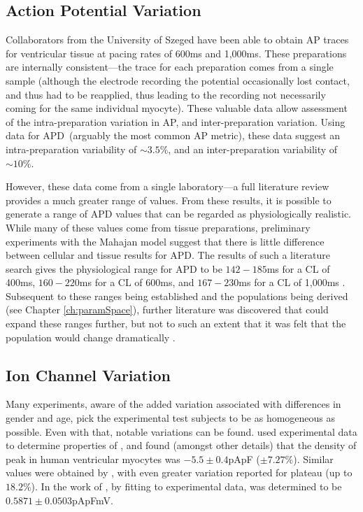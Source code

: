 \documentclass[../thesis-main.tex]{subfiles}
\begin{document}
\subsection{Action Potential Variation}
\label{subsec:ap-variation}
Collaborators from the University of Szeged have been able to obtain AP traces for ventricular tissue at pacing rates of 600ms and 1,000ms. These preparations are internally consistent---the trace for each preparation comes from a single sample (although the electrode recording the potential occasionally lost contact, and thus had to be reapplied, thus leading to the recording not necessarily coming for the same individual myocyte). These valuable data allow assessment of the intra-preparation variation in AP, and inter-preparation variation. Using data for APD~(arguably the most common AP metric), these data suggest an intra-preparation variability of $\sim3.5\%$, and an inter-preparation variability of $\sim10\%$.

However, these data come from a single laboratory---a full literature review provides a much greater range of values. From these results, it is possible to generate a range of APD values that can be regarded as physiologically realistic. While many of these values come from tissue preparations, preliminary experiments with the Mahajan model suggest that there is little difference between cellular and tissue results for APD. The results of such a literature search gives the physiological range for APD to be $142-185$ms for a CL of 400ms, $160-220$ms for a CL of 600ms, and $167-230$ms for a CL of 1,000ms \citep{Biagetti2006, Szigligeti1996, Yan2001, Jung2011, Goldhaber2005, Wu2011, Wu2008, Wu2008a, Chen2006, Kirchhof2003, Eckardt1998, Zabel1997, Zabel1997a, Kurz1993, McIntosh2000}. Subsequent to these ranges being established and the populations being derived (see Chapter \ref{ch:paramSpace}), further literature was discovered that could expand these ranges further, but not to such an extent that it was felt that the population would change dramatically \citep{Wu2006}.

\subsection{Ion Channel Variation}
\label{subsec:ionChannel-variation}
Many experiments, aware of the added variation associated with differences in gender and age, pick the experimental test subjects to be as homogeneous as possible. Even with that, notable variations can be found. \citet{Fulop2004} used experimental data to determine properties of \ica{}, and found (amongst other details) that the density of peak \ica{} in human ventricular myocytes was $-5.5\pm0.4$pApF ($\pm7.27\%$). Similar values were obtained by \citet{Li1999}, with even greater variation reported for plateau \ica{} (up to $18.2\%$). In the work of \citet{Fink2008}, by fitting to experimental data, \gkix{} was determined to be $0.5871\pm0.0503$pApFmV.
\end{document}
